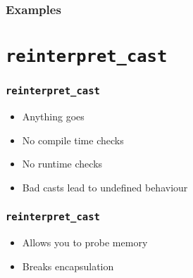 \documentclass{../ucll-slides}
\begin{document}
\begin{frame}
  \frametitle{Examples}
\end{frame}

\section{{\tt reinterpret\_cast}}

\frame{\tableofcontents[currentsection]}


\begin{frame}
  \frametitle{{\tt reinterpret\_cast}}
  \begin{itemize}
    \item Anything goes
    \item No compile time checks
    \item No runtime checks
    \item Bad casts lead to undefined behaviour
  \end{itemize}
\end{frame}

\begin{frame}
  \frametitle{{\tt reinterpret\_cast}}
  \begin{itemize}
    \item Allows you to probe memory
    \item Breaks encapsulation
  \end{itemize}
  \begin{overprint}
  \end{overprint}
\end{frame}
\end{document}
